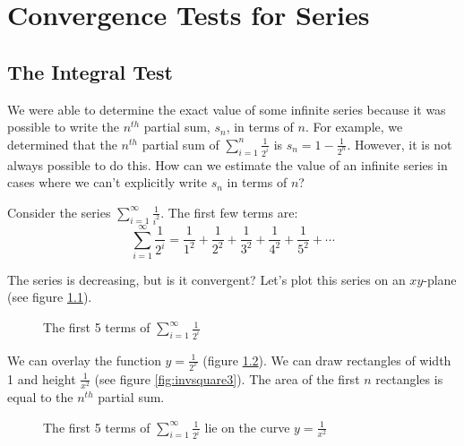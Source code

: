 \chapter{Convergence Tests for Series}

\section{The Integral Test}
We were able to determine the exact value of some infinite series because it 
was possible to write the $n^{th}$ partial sum, $s_n$, in terms of $n$. For 
example, we determined that the $n^{th}$ partial sum of $\sum_{i = 1}^n 
\frac{1}{2^i}$ is $s_n = 1 - \frac{1}{2^n}$. However, it is not always possible 
to do this. How can we estimate the value of an infinite series in cases where 
we can't explicitly write $s_n$ in terms of $n$?

Consider the series $\sum_{i = 1}^\infty \frac{1}{i^2}$. The first few terms 
are:
$$\sum_{i = 1}^\infty \frac{1}{2^i} = \frac{1}{1^2} + \frac{1}{2^2} + 
\frac{1}{3^2} + \frac{1}{4^2} + \frac{1}{5^2} + \cdots$$

The series is decreasing, but is it convergent? Let's plot this series on an 
$xy$-plane (see figure \ref{fig:invsquare1}). 

\begin{figure}[htbp]
    \centering
    \caption{The first 5 terms of $\sum_{i = 1}^\infty \frac{1}{2^i}$}
    \label{fig:invsquare1}
\end{figure}

We can overlay the function $y = \frac{1}{2^x}$ (figure \ref{fig:invsquare2}). 
We can draw rectangles of width 1 and height $\frac{1}{x^2}$ (see figure 
\ref{fig:invsquare3}). The area of the first $n$ rectangles is equal to the 
$n^{th}$ partial sum. 

\begin{figure}[htbp]
    \centering
    \caption{The first 5 terms of $\sum_{i = 1}^\infty \frac{1}{2^i}$ lie on 
    the curve $y = \frac{1}{x^2}$}
    \label{fig:invsquare2}
\end{figure}

